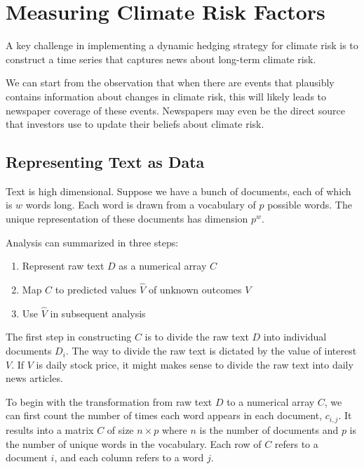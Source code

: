 \chapter{Measuring Climate Risk Factors}

A key challenge in implementing a dynamic 
hedging strategy for climate risk is to 
construct a time series that captures 
news about long-term climate risk.

We can start from the observation that 
when there are events that 
plausibly contains information about changes 
in climate risk, this will likely leads 
to newspaper coverage of these events.
Newspapers may even be the direct source 
that investors use to update their beliefs
about climate risk.

\section{Representing Text as Data}
 
Text is high dimensional. 
Suppose we have a bunch of documents, each of 
which is $w$ words long. Each word is 
drawn from a vocabulary of $p$ possible 
words. The unique representation of these 
documents has dimension $p^w$. 

Analysis can 
summarized in three steps:

\begin{enumerate}
    \item Represent raw text $D$ as a numerical 
    array $C$
    \item Map $C$ to predicted 
    values $\hat{V}$ of unknown outcomes 
    $V$
    \item Use $\hat{V}$ in subsequent analysis
\end{enumerate}


The first step in constructing $C$ is 
to divide the raw text $D$ into individual documents 
$D_i$. The way to divide the raw text 
is dictated by the value of interest $V$. 
If $V$ is daily stock price, it might makes sense
to divide the raw text into daily news articles.

To begin with the transformation from raw text $D$ to
a numerical array $C$, we can first count 
the number of times each word appears in each document, $c_{i,j}$.
It results into a matrix $C$ of size $n \times p$ where $n$ is the number of documents and $p$ is 
the number of unique words in the vocabulary.
Each row of $C$ refers to a document $i$, and each column refers to a word $j$.

